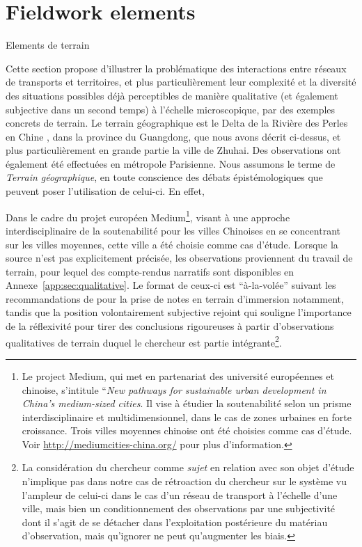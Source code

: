 


\newpage


\section{Fieldwork elements}{Elements de terrain}

\label{sec:qualitative}




Cette section propose d'illustrer la problématique des interactions entre réseaux de transports et territoires, et plus particulièrement leur complexité et la diversité des situations possibles déjà perceptibles de manière qualitative (et également subjective dans un second temps) à l'échelle microscopique, par des exemples concrets de terrain. Le terrain géographique est le Delta de la Rivière des Perles en Chine , dans la province du Guangdong, que nous avons décrit ci-dessus, et plus particulièrement en grande partie la ville de Zhuhai. Des observations ont également été effectuées en métropole Parisienne. Nous assumons le terme de \emph{Terrain géographique}, en toute conscience des débats épistémologiques que peuvent poser l'utilisation de celui-ci. En effet, 


Dans le cadre du projet européen Medium\footnote{Le project Medium, qui met en partenariat des université européennes et chinoise, s'intitule ``\textit{New pathways for sustainable urban development in China’s medium-sized cities}. Il vise à étudier la soutenabilité selon un prisme interdisciplinaire et multidimensionnel, dans le cas de zones urbaines en forte croissance. Trois villes moyennes chinoise ont été choisies comme cas d'étude. Voir \url{http://mediumcities-china.org/} pour plus d'information.}, visant à une approche interdisciplinaire de la soutenabilité pour les villes Chinoises en se concentrant sur les villes moyennes, cette ville a été choisie comme cas d'étude. Lorsque la source n'est pas explicitement précisée, les observations proviennent du travail de terrain, pour lequel des compte-rendus narratifs sont disponibles en Annexe~\ref{app:sec:qualitative}. Le format de ceux-ci est ``à-la-volée'' suivant les recommandations de \cite{goffman1989fieldwork} pour la prise de notes en terrain d'immersion notamment, tandis que la position volontairement subjective rejoint \cite{ball1990self} qui souligne l'importance de la réflexivité pour tirer des conclusions rigoureuses à partir d'observations qualitatives de terrain duquel le chercheur est partie intégrante\footnote{La considération du chercheur comme \emph{sujet} en relation avec son objet d'étude n'implique pas dans notre cas de rétroaction du chercheur sur le système vu l'ampleur de celui-ci dans le cas d'un réseau de transport à l'échelle d'une ville, mais bien un conditionnement des observations par une subjectivité dont il s'agit de se détacher dans l'exploitation postérieure du matériau d'observation, mais qu'ignorer ne peut qu'augmenter les biais.}.




